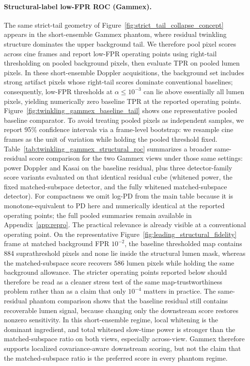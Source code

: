 \documentclass[11pt]{article}
\newif\ifSTAPPAPERONLY
\newcommand{\SuppOrApp}[1]{\ifSTAPPAPERONLY Supplementary Material\else Appendix~\ref{#1}\fi}
\begin{document}
\paragraph{Structural-label low-FPR ROC (Gammex).}
The same strict-tail geometry of Figure~\ref{fig:strict_tail_collapse_concept} appears in the short-ensemble Gammex phantom, where residual twinkling structure dominates the upper background tail. We therefore pool pixel scores across cine frames and report low-FPR operating points using right-tail thresholding on pooled background pixels, then evaluate TPR on pooled lumen pixels. In these short-ensemble Doppler acquisitions, the background set includes strong artifact pixels whose right-tail scores dominate conventional baselines; consequently, low-FPR thresholds at $\alpha\le 10^{-3}$ can lie above essentially all lumen pixels, yielding numerically zero baseline TPR at the reported operating points. Figure~\ref{fig:twinkling_gammex_baseline_tail} shows one representative pooled baseline comparator. To avoid treating pooled pixels as independent samples, we report 95\% confidence intervals via a frame-level bootstrap: we resample cine frames as the unit of variation while holding the pooled threshold fixed. Table~\ref{tab:twinkling_gammex_structural_roc} summarizes a broader same-residual score comparison for the two Gammex views under those same settings: power Doppler and Kasai on the baseline residual, plus three detector-family score variants evaluated on that identical residual cube (whitened power, the fixed matched-subspace detector, and the fully whitened matched-subspace detector). For compactness we omit log-PD from the main table because it is monotone-equivalent to PD here and numerically identical at the reported operating points; the full pooled summaries remain available in \SuppOrApp{app:repro}.
The practical relevance is already visible at a conventional operating point. On the representative Figure~\ref{fig:leading_structural_fidelity} frame at matched background FPR $10^{-2}$, the baseline thresholded map contains 884 suprathreshold pixels and none lie inside the structural lumen mask, whereas the matched-subspace score recovers 586 lumen pixels while holding the same background allowance. The stricter operating points reported below should therefore be read as a cleaner stress test of the same map-trustworthiness problem rather than as a claim that only $10^{-4}$ matters in practice.
The same-residual phantom comparison shows that the baseline residual still contains recoverable lumen signal, because changing only the downstream score restores nonzero sensitivity. In this short-ensemble regime, local whitening is the dominant ingredient, and total whitened slow-time power is stronger than the matched-subspace ratio on both views, especially across-view. Gammex therefore supports localized covariance-aware downstream scoring, but not the claim that the matched-subspace ratio is the preferred score in every phantom regime.
\end{document}
